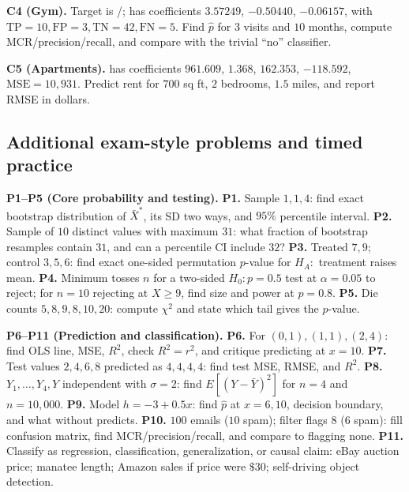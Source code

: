 \documentclass[10pt]{scrartcl}
\begin{document}
\begin{prob}
\textbf{C4 (Gym).} Target  is /;  has coefficients $3.57249$, $-0.50440$, $-0.06157$, with $\mathrm{TP}=10, \mathrm{FP}=3, \mathrm{TN}=42, \mathrm{FN}=5$. Find $\hat p$ for $3$ visits and $10$ months, compute MCR/precision/recall, and compare with the trivial ``no'' classifier.
\end{prob}

\begin{prob}
\textbf{C5 (Apartments).}  has coefficients $961.609$, $1.368$, $162.353$, $-118.592$, $\mathrm{MSE} = 10{,}931$. Predict rent for $700$ sq ft, $2$ bedrooms, $1.5$ miles, and report RMSE in dollars.
\end{prob}

\subsection{Additional exam-style problems and timed practice}

\begin{prob}
\textbf{P1--P5 (Core probability and testing).}
\textbf{P1.} Sample $1, 1, 4$: find exact bootstrap distribution of $\bar X^*$, its SD two ways, and $95\%$ percentile interval.
\textbf{P2.} Sample of $10$ distinct values with maximum $31$: what fraction of bootstrap resamples contain $31$, and can a percentile CI include $32$?
\textbf{P3.} Treated $7, 9$; control $3, 5, 6$: find exact one-sided permutation $p$-value for $H_A\colon$ treatment raises mean.
\textbf{P4.} Minimum tosses $n$ for a two-sided $H_0\colon p = 0.5$ test at $\alpha = 0.05$ to reject; for $n=10$ rejecting at $X \ge 9$, find size and power at $p = 0.8$.
\textbf{P5.} Die counts $5, 8, 9, 8, 10, 20$: compute $\chi^2$ and state which tail gives the $p$-value.
\end{prob}

\begin{prob}
\textbf{P6--P11 (Prediction and classification).}
\textbf{P6.} For $(0,1), (1,1), (2,4)$: find OLS line, MSE, $R^2$, check $R^2 = r^2$, and critique predicting at $x=10$.
\textbf{P7.} Test values $2, 4, 6, 8$ predicted as $4, 4, 4, 4$: find test MSE, RMSE, and $R^2$.
\textbf{P8.} $Y_1,\dots,Y_4, Y$ independent with $\sigma = 2$: find $E[(Y - \bar Y)^2]$ for $n=4$ and $n=10{,}000$.
\textbf{P9.} Model $h = -3 + 0.5x$: find $\hat p$ at $x=6, 10$, decision boundary, and what  without  predicts.
\textbf{P10.} $100$ emails ($10$ spam); filter flags $8$ ($6$ spam): fill confusion matrix, find MCR/precision/recall, and compare to flagging none.
\textbf{P11.} Classify as regression, classification, generalization, or causal claim: eBay auction price; manatee length; Amazon sales if price were $\$30$; self-driving object detection.
\end{prob}
\end{document}
